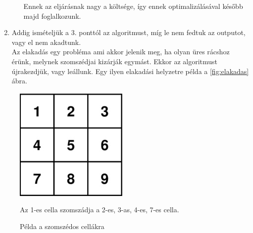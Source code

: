 \begin{enumerate}
\begin{itemize}
        Ennek az eljárásnak nagy a költsége, így ennek optimalizálásával később majd foglalkozunk.
    \end{itemize}
    \item Addig ismételjük a 3. ponttól az algoritmust, míg le nem fedtuk az outputot, vagy el nem akadtunk.\\
    Az elakadás egy probléma ami akkor jelenik meg, ha olyan üres rácshoz érünk, melynek szomszédjai kizárják egymást. Ekkor az algoritmust újrakezdjük, vagy leállunk. Egy ilyen elakadási helyzetre példa a \ref{fig:elakadas} ábra.
\end{enumerate}
\begin{figure}
    \centering
    \includegraphics{images/grid.jpg}
    \caption{Példa a szomszédos cellákra}
    Az 1-es cella szomszádja a 2-es, 3-as, 4-es, 7-es cella.
    \label{fig:cella-pelda}
\end{figure}
